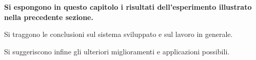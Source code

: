 {\bfseries
Si espongono in questo capitolo i risultati dell'esperimento illustrato
nella precedente sezione.

Si traggono le conclusioni sul sistema sviluppato e sul lavoro in generale.

Si suggeriscono infine gli ulteriori miglioramenti e applicazioni possibili.
}